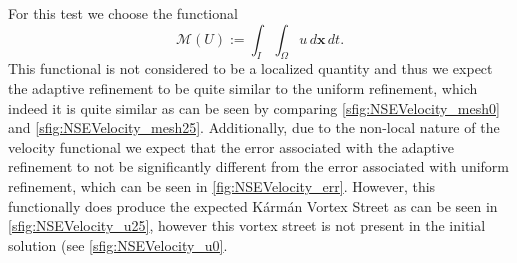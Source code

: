 \begin{test} \label{tst:Velocity}
    For this test we choose the functional
    \begin{equation}
        \mathcal{M}(U) := \int_I\! \int_{\Omega}\! u\, d\mathbf{x}\, dt.
        \label{eq:VelocityFunctional}
    \end{equation}
    This functional is not considered to be a localized quantity and thus we
    expect the adaptive refinement to be quite similar to the uniform
    refinement, which indeed it is quite similar as can be seen by comparing
    \autoref{sfig:NSEVelocity_mesh0} and \autoref{sfig:NSEVelocity_mesh25}.
    Additionally, due to the non-local nature of the velocity functional
    we expect that the error associated with the adaptive refinement to
    not be significantly different from the error associated with
    uniform refinement, which can be seen in \autoref{fig:NSEVelocity_err}.
    However, this functionally does produce the expected K\'arm\'an Vortex
    Street as can be seen in \autoref{sfig:NSEVelocity_u25}, however this vortex
    street is not present in the initial solution (see
    \autoref{sfig:NSEVelocity_u0}.


\end{test}

